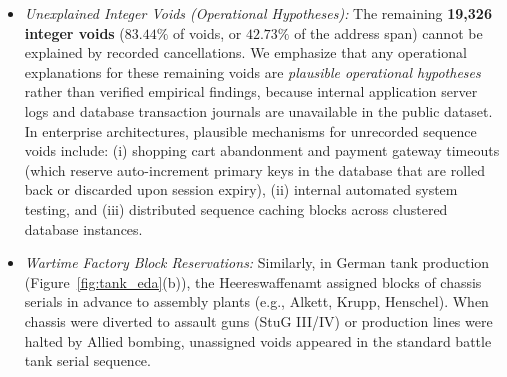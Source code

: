 \documentclass[10pt,a4paper]{article}
\begin{document}
\begin{enumerate}
\begin{itemize}
        \item \textit{Unexplained Integer Voids (Operational Hypotheses):} The remaining \textbf{19,326 integer voids} ($83.44\%$ of voids, or $42.73\%$ of the address span) cannot be explained by recorded cancellations. We emphasize that any operational explanations for these remaining voids are \emph{plausible operational hypotheses} rather than verified empirical findings, because internal application server logs and database transaction journals are unavailable in the public dataset. In enterprise architectures, plausible mechanisms for unrecorded sequence voids include: (i) shopping cart abandonment and payment gateway timeouts (which reserve auto-increment primary keys in the database that are rolled back or discarded upon session expiry), (ii) internal automated system testing, and (iii) distributed sequence caching blocks across clustered database instances.
        \item \textit{Wartime Factory Block Reservations:} Similarly, in German tank production (Figure~\ref{fig:tank_eda}(b)), the Heereswaffenamt assigned blocks of chassis serials in advance to assembly plants (e.g., Alkett, Krupp, Henschel). When chassis were diverted to assault guns (StuG III/IV) or production lines were halted by Allied bombing, unassigned voids appeared in the standard battle tank serial sequence.
    \end{itemize}
\end{enumerate}
\end{document}

